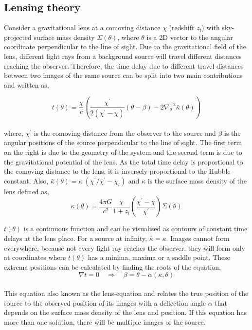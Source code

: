 \subsection{Lensing theory}

Consider a gravitational lens at a comoving distance $\chi$ (redshift $z_l$) 
with sky-projected surface
mass density $\Sigma(\theta)$, where $\theta$ is a 2D vector to the
angular coordinate perpendicular to the line of sight. Due to the 
gravitational field of the lens, different light rays from a background source
will travel different distances reaching the observer. Therefore, the time delay
due to different travel distances between two images of the same source can be
split into two main contributions and written as,

\begin{equation}
	t(\theta) = \dfrac{\chi}{c} \left( \dfrac{\chi^{\prime}}{2(\chi^{\prime}-\chi)} 
				(\theta-\beta) 
				- 2\nabla_{\theta}^{-2} \bar{\kappa}(\theta) \right)
	\label{eqn:timedelay}
\end{equation}
\\
where, $\chi^{\prime}$ is the comoving distance from the observer
to the source and $\beta$ is 
the angular positions of the source perpendicular to the line of sight.
The first term on the right is due to the geometry of the system
and the second term is due to the gravitational potential of the lens.
As the total time delay is proportional to the comoving distance
to the lens, it is inversely proportional to the Hubble constant. 
Also, $\bar{\kappa}(\theta) = \kappa\ (\chi^{\prime}/\chi^{\prime}-\chi_l)$ and
$\kappa$ is the surface mass density of the lens defined as,
\begin{equation}
	\kappa(\theta) = \dfrac{4\pi G}{c^2} \dfrac{\chi}{1+z_l}
					  \left(\dfrac{\chi^{\prime}-\chi}{\chi^{\prime}}\right) \Sigma(\theta)
\end{equation}

$t(\theta)$ is a continuous function and can be visualised as contours
of constant time delays at the lens place. For a source at infinity,
$\bar{\kappa}=\kappa$.
Images cannot form everywhere, because not every light
ray reaches the observer, they will form only at coordinates where $t(\theta)$
has a minima, maxima or a saddle point. These extrema positions can 
be calculated by finding the roots of the equation,
\begin{equation}
	\nabla t = 0 \quad \Rightarrow \quad \beta = \theta - \alpha(\kappa,\theta)
\end{equation}
\\
This equation also known as the lens-equation and relates the true 
position of the source to the observed position of its images with
a deflection angle $\alpha$ that depends on the surface mass density
of the lens and position. If this equation has more than one solution,
there will be multiple images of the source.

